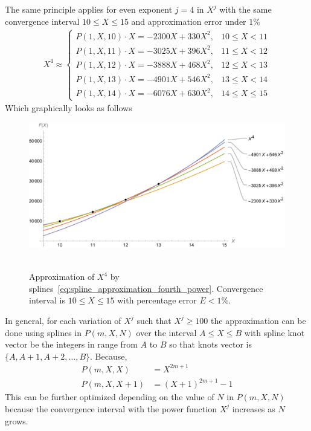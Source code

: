 The same principle applies for even exponent $j=4$ in $X^j$ with the same convergence interval $10 \leq X \leq 15$
and approximation error under $1\%$
\begin{align}
    X^4 \approx
    \begin{cases}
        P(1,X,10) \cdot X = -2300X + 330X^2, & 10 \leq X < 11 \\
        P(1,X,11) \cdot X = -3025X + 396X^2, & 11 \leq X < 12 \\
        P(1,X,12) \cdot X = -3888X + 468X^2, & 12 \leq X < 13 \\
        P(1,X,13) \cdot X = -4901X + 546X^2, & 13 \leq X < 14 \\
        P(1,X,14) \cdot X = -6076X + 630X^2, & 14 \leq X \leq 15
    \end{cases}
    \label{eq:spline_approximation_fourth_power}
\end{align}
Which graphically looks as follows
\begin{figure}[H]
    \centering
    \includegraphics[width=1\textwidth]{sections/images/09_plots_of_fourth_power_with_p_2_10_15_times_x}
    ~\caption{
        Approximation of $X^4$ by splines~\eqref{eq:spline_approximation_fourth_power}.
        Convergence interval is $10 \leq X \leq 15$ with percentage error $E < 1\%$.
    }
    \label{fig:09_plots_of_fourth_power_with_p_2_10_15_times_x}
\end{figure}
In general, for each variation of $X^j$ such that $X^j \geq 100$ the approximation can be done using
splines in $P(m,X, N)$ over the interval $A \leq X \leq B$ with spline knot vector be the integers in
range from $A$ to $B$ so that knots vector is $\{A, A+1, A+2, \ldots, B \}$.
Because,
\begin{align*}
    P(m,X, X) &= X^{2m+1} \\
    P(m,X, X+1) &= (X+1)^{2m+1} - 1
\end{align*}
This can be further optimized depending on the value of $N$ in $P(m,X,N)$ because the convergence interval
with the power function $X^j$ increases as $N$ grows.
